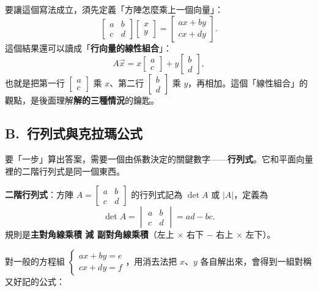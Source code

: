 \documentclass[11pt]{article}
\begin{document}
要讓這個寫法成立，須先定義「方陣怎麼乘上一個向量」：
$$\begin{bmatrix} a & b\\ c & d \end{bmatrix}\begin{bmatrix} x\\ y \end{bmatrix}=\begin{bmatrix} ax+by\\ cx+dy \end{bmatrix}.$$
這個結果還可以讀成「\textbf{行向量的線性組合}」：
$$A\vec x=x\begin{bmatrix} a\\ c \end{bmatrix}+y\begin{bmatrix} b\\ d \end{bmatrix},$$
也就是把第一行 $\begin{bmatrix} a\\ c \end{bmatrix}$ 乘 $x$、第二行 $\begin{bmatrix} b\\ d \end{bmatrix}$ 乘 $y$，再相加。這個「線性組合」的觀點，是後面理解\textbf{解的三種情況}的鑰匙。

\subsection*{\sffamily B.\ 行列式與克拉瑪公式}

要「一步」算出答案，需要一個由係數決定的關鍵數字——\textbf{行列式}。它和平面向量裡的二階行列式是同一個東西。

\textbf{二階行列式}：方陣 $A=\begin{bmatrix} a & b\\ c & d \end{bmatrix}$ 的行列式記為 $\det A$ 或 $|A|$，定義為
$$\det A=\begin{vmatrix} a & b\\ c & d \end{vmatrix}=ad-bc.$$
規則是\textbf{主對角線乘積 減 副對角線乘積}（左上 $\times$ 右下 $-$ 右上 $\times$ 左下）。

對一般的方程組 $\begin{cases} ax+by=e\\ cx+dy=f \end{cases}$，用消去法把 $x$、$y$ 各自解出來，會得到一組對稱又好記的公式：
\end{document}
